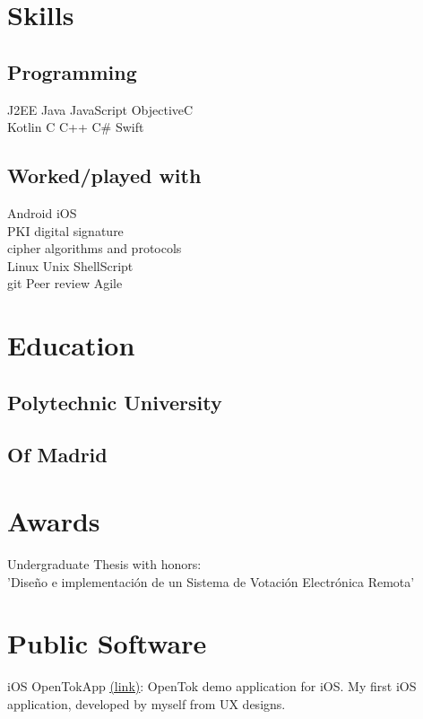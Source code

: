 \documentclass[]{resume}
\begin{document}
\begin{minipage}[t]{0.33\textwidth}


\section{Skills}
\subsection{Programming}
J2EE \textbullet{} Java \textbullet{} JavaScript \textbullet{} ObjectiveC \\
Kotlin \textbullet{} C \textbullet{} C++ \textbullet{} C\# \textbullet{} Swift \\
\sectionsep
\subsection{Worked/played with}
Android \textbullet{} iOS \\
PKI \textbullet{} digital signature \\
cipher algorithms and protocols \\
Linux \textbullet{} Unix \textbullet{} ShellScript \\
git \textbullet{} Peer review \textbullet{} Agile
\sectionsep

\section{Education}
\subsection{Polytechnic University}
\subsection{Of Madrid}
\sectionsep

\section{Awards}
Undergraduate Thesis with honors:\\
'Diseño e implementación de un Sistema de Votación Electrónica Remota'\\
\sectionsep


\section{Public Software}
\textbullet{} iOS OpenTokApp \href{https://itunes.apple.com/us/app/opentokapp/id1106222570?mt=8}{{\underline{(link)}}}:
OpenTok demo application for iOS. My first iOS application, developed by myself from UX designs.



\end{minipage}
\end{document}
